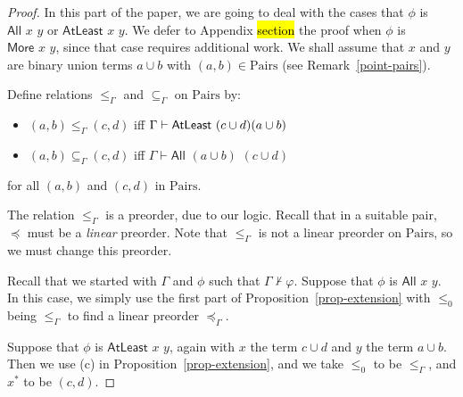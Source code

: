 \documentclass[letterpaper]{article} %
\theoremstyle{definition}
\newcommand{\proves}{\vdash}
\newcommand{\rem}[1]{\relax}
\newcommand{\All}[2]{\mathsf{All}\,\,#1\,\,#2}
\newcommand{\Atleast}[2]{\mathsf{AtLeast}\,\,#1\,\,#2}
\newcommand{\More}[2]{\mathsf{More}\,\,#1\,\,#2}
\newcommand{\Pairs}{\mbox{Pairs}}
\newcommand{\provsub}{\subseteq_{\Gamma}}
\newcommand{\provle}{\le_{\Gamma}}
\newcommand{\provextended}{\preceq_{\Gamma}}
\begin{document}
{\begin{proof}
In this part of the paper, we are going to deal with the cases
that $\phi$ is $\All{x}{y}$ or $\Atleast{x}{y}$.   We defer to Appendix \hl{section}
the proof when  $\phi$ is $\More{x}{y}$, since that case requires additional work.
We shall assume that $x$ and $y$ are binary union terms $a\cup b$ with $(a,b)\in\Pairs$
(see Remark~\ref{point-pairs}).

Define relations $\provle$ and $\provsub$ on $\Pairs$ by:

\begin{itemize}%
    \item $(a,b) \provle (c,d)$ iff $\Gamma \vdash  \Atleast{(c \cup d){(a \cup b)}}$
    
    \item $(a,b) \provsub (c,d)$ iff $\Gamma \vdash \All{(a \cup b)}{(c \cup d)}$
\end{itemize}
for all $(a,b)$ and  $(c,d)$ in $\Pairs$.  

The relation $\provle$ is a preorder, due to our logic.
Recall that in a suitable pair, $\preceq$ must be a \emph{linear} preorder.
Note that $\provle$ is not a linear preorder on $\Pairs$,
so we must change this preorder.




Recall that we started with $\Gamma$ and $\phi$ such that 
$\Gamma \not \proves \varphi$. 
Suppose that $\phi$ is $\All{x}{y}$.
In this case, we simply use the first part of 
Proposition~\ref{prop-extension} with $\leq_0$ being $\provle$
to find a linear preorder $\provextended$.
 

Suppose that
 $\phi$ is $\Atleast{x}{y}$, again with $x$ the term $c\cup d$ and $y$ the term $a\cup b$.
Then we use (c) in 
Proposition~\ref{prop-extension}, and   we take $\leq_0$ to be $\provle$, and $x^*$ to be $(c,d)$.

\rem{
Suppose that $\phi$ is $\More{x}{y}$,
with $x$ being $c\cup d$ and $y$ being $a\cup b$.  We assume both $(a,b)$ and $(c,d)$ are in $\Pairs$.
We are assuming that $\Gamma\not\proves\phi$.   If $\Gamma\not\proves\Atleast{x}{y}$,
then we get $\leq_1$ from the previous paragraph.   If $\Gamma\proves\Atleast{x}{y}$,
we have two subcases.  If also $\Gamma\proves\Atleast{y}{x}$, we use Proposition~\ref{prop-extension}
without the ``Moreover'' part.   If $\Gamma\not\proves\Atleast{y}{x}$,
  use (c) in 
Proposition~\ref{prop-extension} with $\leq_0$ being $\provle$, $x^*$ being $(a,b)$,
and $y^*$ being $(c,d)$.
}

\bigskip


\end{proof}}
\end{document}
